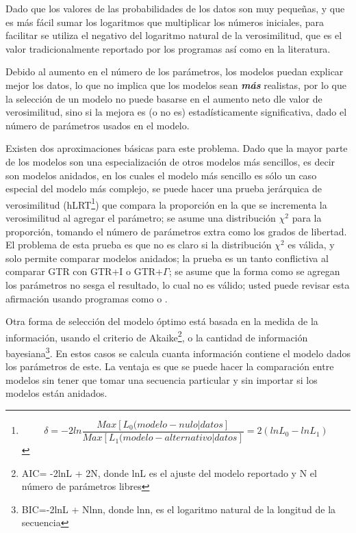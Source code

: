 Dado que los valores de las probabilidades de los datos son muy peque\~nas, y que es m\'as f\'acil sumar los logaritmos que multiplicar los n\'umeros iniciales, para facilitar se utiliza el negativo del logaritmo natural de la verosimilitud, que es el valor tradicionalmente reportado por los programas as\'i como en la literatura.

Debido al aumento en el n\'umero de los par\'ametros, los modelos puedan explicar mejor los datos, lo que no implica que los modelos sean \emph{\textbf{m\'as}} realistas, por lo que la selecci\'on de un modelo no puede basarse en el aumento neto dle valor de verosimilitud, sino si la mejora es (o no es) estad\'isticamente significativa, dado el n\'umero de par\'ametros usados en el modelo.

Existen dos aproximaciones b\'asicas para este problema. Dado que la mayor parte de los modelos son una especializaci\'on de otros modelos m\'as sencillos, es decir son modelos anidados, en los cuales el modelo m\'as sencillo es s\'olo un caso especial del modelo m\'as complejo, se puede hacer una prueba jer\'arquica de verosimilitud (hLRT\footnote
{\begin{equation}
\delta = -2 ln \frac{Max[L_{0}(modelo-nulo|datos]}{Max[L_{1}(modelo-alternativo|datos]} = 2 (ln L_{0} - ln L_{1}) 
\end{equation}
}) que compara la proporci\'on en la que se incrementa la verosimilitud al agregar el par\'ametro; se asume una distribuci\'on $\chi^2$  para la proporci\'on, tomando el n\'umero de par\'ametros extra como los grados de libertad. El problema de esta prueba es que no es claro si la distribuci\'on $\chi^2$ es v\'alida, y solo permite comparar modelos anidados; la prueba es un tanto conflictiva al comparar GTR con GTR+I o GTR+$\Gamma$; se asume que la forma como se agregan los par\'ametros no sesga el resultado, lo cual no es v\'alido; usted puede revisar esta afirmaci\'on usando programas como  o .

Otra forma de selecci\'on del modelo \'optimo  est\'a basada en la medida de la informaci\'on, usando el criterio de Akaike\footnote{AIC= -2lnL + 2N, donde lnL es el ajuste del modelo reportado y N el n\'umero de par\'ametros libres}, 
o la cantidad de informaci\'on bayesiana\footnote{BIC=-2lnL + Nlnn, donde lnn, es el logaritmo natural de la longitud de la secuencia}.  
En estos casos se calcula cuanta informaci\'on contiene el modelo dados los par\'ametros de este. La ventaja es que se puede hacer la comparaci\'on entre modelos sin tener que tomar una secuencia particular y sin importar si los modelos est\'an anidados.

